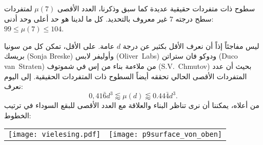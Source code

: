 \begin{surferPage}{سطوح ذات متفردات حقيقية عديدة}
كما سبق وذكرنا، العدد الأقصى $\mu(7)$ لمتفردات سطح درجته $7$ غير معروف بالتحديد. كل ما لدينا هو حد أعلى وحد أدنى: $99\le \mu(7) \le 104$.

   ليس مفاجئاً إذاً أن نعرف الأقل بكثير عن درجة  $d$ عامة.
    على الأقل، تمكن كل من سونيا بريسك
    \textenglish{(Sonja Breske)}
     وأوليفر لابس
      \textenglish{\mbox{(Oliver~Labs)}}
       ودوكو فان ستراتن
        \textenglish{(Duco van~Straten)}
         من ملاءمة بناء من إس في شموتوف
         \textenglish{(S.V.\ Chmutov)}
         بحيث أن عدد المتفردات الأقصى الحالي تحققه أيضاً السطوح ذات المتفردات الحقيقية.
    إلى اليوم نعرف:
    \[0,41\bar{6}d^3 \lessapprox \mu(d) \lessapprox 0.44\bar{4} d^3.\]
    من أعلاه، يمكننا أن نرى تناظر البناء والعلاقة مع العدد الأقصى للبقع السوداء في ترتيب الخطوط:
    \begin{center}
      \begin{tabular}{c@{\qquad}c}
        \texttt{[image: vielesing.pdf]}
        &
        \texttt{[image: p9surface\_von\_oben]}
      \end{tabular}
    \end{center}
\end{surferPage}
